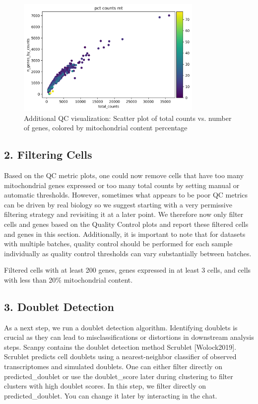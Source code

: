 \documentclass[12pt]{article}
\begin{document}
\begin{figure}[H]
    \centering
    \includegraphics[width=0.8\textwidth]{qc_scatter.png}
    \caption{Additional QC visualization: Scatter plot of total counts vs. number of genes, colored by mitochondrial content percentage}
    \label{fig:qc_scatter}
\end{figure}

\subsection{2. Filtering Cells}
Based on the QC metric plots, one could now remove cells that have too many mitochondrial genes expressed or too many total counts by setting manual or automatic thresholds. However, sometimes what appears to be poor QC metrics can be driven by real biology so we suggest starting with a very permissive filtering strategy and revisiting it at a later point. We therefore now only filter cells and genes based on the Quality Control plots and report these filtered cells and genes in this section. Additionally, it is important to note that for datasets with multiple batches, quality control should be performed for each sample individually as quality control thresholds can vary substantially between batches.

Filtered cells with at least 200 genes, genes expressed in at least 3 cells, and cells with less than 20\% mitochondrial content.

\subsection{3. Doublet Detection}
As a next step, we run a doublet detection algorithm. Identifying doublets is crucial as they can lead to misclassifications or distortions in downstream analysis steps. Scanpy contains the doublet detection method Scrublet [Wolock2019]. Scrublet predicts cell doublets using a nearest-neighbor classifier of observed transcriptomes and simulated doublets. One can either filter directly on predicted\_doublet or use the doublet\_score later during clustering to filter clusters with high doublet scores. In this step, we filter directly on predicted\_doublet. You can change it later by interacting in the chat.
\end{document}

